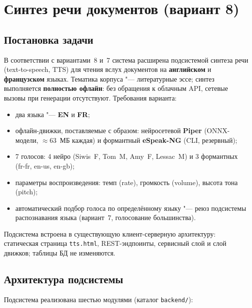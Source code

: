 \section{Синтез речи документов (вариант 8)}
\label{sec:speech}

\subsection{Постановка задачи}

В соответствии с вариантами~8 и~7 система расширена подсистемой
синтеза речи (text-to-speech, TTS) для чтения вслух документов на
\textbf{английском} и \textbf{французском} языках. Тематика корпуса "--- литературные
эссе; синтез выполняется \textbf{полностью офлайн}: без обращения к облачным
API, сетевые вызовы при генерации отсутствуют. Требования варианта:

\begin{itemize}
	\item два языка "--- \textbf{EN} и \textbf{FR};
	\item офлайн-движки, поставляемые с образом: нейросетевой \textbf{Piper}
	      (ONNX-модели, $\approx$63~МБ каждая) и формантный \textbf{eSpeak-NG}
	      (CLI, резервный);
	\item 7 голосов: 4 нейро (Siwis~F, Tom~M, Amy~F, Lessac~M)
	      и 3 формантных (fr-fr, en-us, en-gb);
	\item параметры воспроизведения: темп (rate), громкость (volume),
	      высота тона (pitch);
	\item автоматический подбор голоса по определённому языку "--- реюз
	      подсистемы распознавания языка (вариант~7, голосование большинства).
\end{itemize}

Подсистема встроена в существующую клиент-серверную архитектуру:
статическая страница \texttt{tts.html}, REST-эндпоинты, сервисный слой
и слой движков; таблицы БД не изменяются.

\subsection{Архитектура подсистемы}

Подсистема реализована шестью модулями (каталог \texttt{backend/}):


